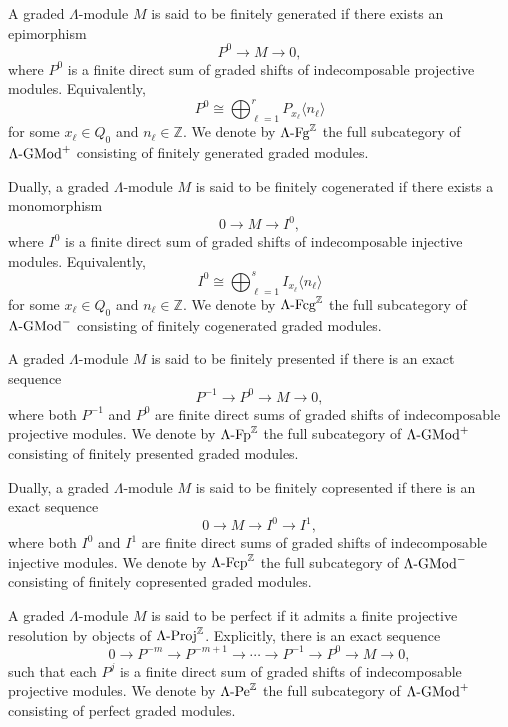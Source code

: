 \documentclass[11pt]{article}
\theoremstyle{definition}
\theoremstyle{remark}
\begin{document}
A graded \(\Lambda\)-module \(M\) is said to be finitely generated if there
exists an epimorphism
\[
P^0\longrightarrow M\longrightarrow 0,
\]
where \(P^0\) is a finite direct sum of graded shifts of indecomposable
projective modules. Equivalently,
\[
P^0\cong
\bigoplus_{\ell=1}^r P_{x_\ell}\langle n_\ell\rangle
\]
for some \(x_\ell\in Q_0\) and \(n_\ell\in\mathbb Z\). We denote by
\(\Lambda\textup{-Fg}^{\mathbb Z}\) the full subcategory of
\(\Lambda\textup{-GMod}^{+}\) consisting of finitely generated graded modules.

Dually, a graded \(\Lambda\)-module \(M\) is said to be finitely cogenerated if
there exists a monomorphism
\[
0\longrightarrow M\longrightarrow I^0,
\]
where \(I^0\) is a finite direct sum of graded shifts of indecomposable
injective modules. Equivalently,
\[
I^0\cong
\bigoplus_{\ell=1}^s I_{x_\ell}\langle n_\ell\rangle
\]
for some \(x_\ell\in Q_0\) and \(n_\ell\in\mathbb Z\). We denote by
\(\Lambda\textup{-Fcg}^{\mathbb Z}\) the full subcategory of
\(\Lambda\textup{-GMod}^{-}\) consisting of finitely cogenerated graded modules.

A graded \(\Lambda\)-module \(M\) is said to be finitely presented if there is
an exact sequence
\[
P^{-1}\longrightarrow P^0\longrightarrow M\longrightarrow 0,
\]
where both \(P^{-1}\) and \(P^0\) are finite direct sums of graded shifts of
indecomposable projective modules. We denote by
\(\Lambda\textup{-Fp}^{\mathbb Z}\) the full subcategory of
\(\Lambda\textup{-GMod}^{+}\) consisting of finitely presented graded modules.

Dually, a graded \(\Lambda\)-module \(M\) is said to be finitely copresented if
there is an exact sequence
\[
0\longrightarrow M\longrightarrow I^0\longrightarrow I^1,
\]
where both \(I^0\) and \(I^1\) are finite direct sums of graded shifts of
indecomposable injective modules. We denote by
\(\Lambda\textup{-Fcp}^{\mathbb Z}\) the full subcategory of
\(\Lambda\textup{-GMod}^{-}\) consisting of finitely copresented graded modules.

A graded \(\Lambda\)-module \(M\) is said to be perfect if it admits a finite
projective resolution by objects of \(\Lambda\textup{-Proj}^{\mathbb Z}\).
Explicitly, there is an exact sequence
\[
0\longrightarrow P^{-m}
\longrightarrow P^{-m+1}
\longrightarrow\cdots
\longrightarrow P^{-1}
\longrightarrow P^0
\longrightarrow M
\longrightarrow 0,
\]
such that each \(P^j\) is a finite direct sum of graded shifts of
indecomposable projective modules. We denote by
\(\Lambda\textup{-Pe}^{\mathbb Z}\) the full subcategory of
\(\Lambda\textup{-GMod}^{+}\) consisting of perfect graded modules.
\end{document}
